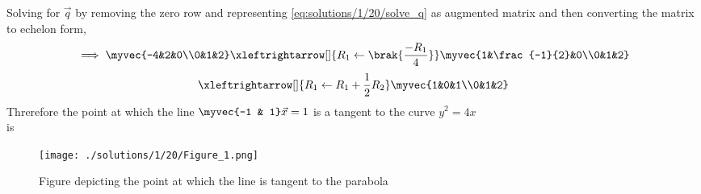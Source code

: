 Solving for $\vec{q}$ by removing the zero row and representing \eqref{eq:solutions/1/20/solve_q} as augmented matrix and then converting the matrix to echelon form,
\begin{align}
\implies \myvec{-4&2&0\\0&1&2} \xleftrightarrow[]{R_1\leftarrow\brak{\frac{-R_1}{4}}} \myvec{1&\frac{-1}{2}&0\\0&1&2}
\end{align}
\begin{align}
\xleftrightarrow[]{R_1\leftarrow R_1+\frac{1}{2}R_2} \myvec{1&0&1\\0&1&2}
\end{align}
Threrefore the point at which the line $\myvec{-1 & 1}\vec{x}=1$
is a tangent to the curve $y^2=4x$\\
is \\
\begin{figure}[h!]
	\centering
	\texttt{[image: ./solutions/1/20/Figure\_1.png]}
	\caption{Figure depicting the point at which the line is tangent to the parabola}
	\label{eq:solutions/1/20/fig1}
\end{figure}
